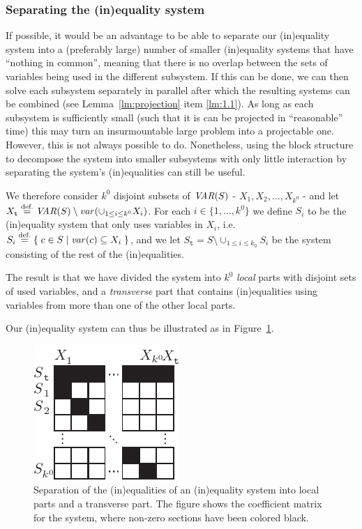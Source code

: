\subsubsection{Separating the (in)equality system}
If possible, it would be an advantage to be able to separate our (in)equality system into a (preferably large) number of smaller (in)equality systems that have ``nothing in common'', meaning that there is no overlap between the sets of variables being used in the different subsystem. If this can be done, we can then solve each subsystem separately in parallel after which the resulting systems can be combined (see Lemma~\ref{lm:projection} item \ref{lm:1.1}). As long as each subsystem is sufficiently small (such that it is can be projected in ``reasonable'' time) this may turn an insurmountable large problem into a projectable one. 
However, this is not always possible to do. Nonetheless, using the block structure to decompose the system into smaller subsystems with only little interaction by separating the system's (in)equalities can still be useful. 
 
We therefore consider $k^0$ disjoint subsets of $\mathit{VAR}(S)$ - $X_1, X_2,\ldots, X_{k^0}$ - and let $X_{\texttt{t}}\overset{\text{def.}}= \mathit{VAR}(S)\setminus \mathit{var}(\cup_{1\leq i\leq k^0}X_i)$. For each $i\in\{1,\ldots, k^0\}$ we define $S_i$ to be the (in)equality system that only uses variables in $X_i$, i.e. $S_i \overset{\text{def.}}= \{\;{c\in S}\;|\;{\mathit{var}(c)\subseteq X_i}\;\}$, and we let $S_\texttt{t} = S\setminus \cup_{1\leq i \leq k_0}S_i$ be the system consisting of the rest of the (in)equalities. 

The result is that we have divided the system into $k^0$ \emph{local} parts with disjoint sets of used variables, and a \emph{transverse} part that contains (in)equalities using variables from more than one of the other local parts. 

Our (in)equality system can thus be illustrated as in Figure~\ref{fig:decomp1}.

\begin{figure}[hb]
	\centering
		\includegraphics{figures/decomp1B2.pdf}
	\caption{Separation of the (in)equalities of an (in)equality system into local parts and a transverse part. 
	The figure shows the coefficient matrix for the system, where non-zero sections have been colored black.}
	\label{fig:decomp1}
\end{figure}

